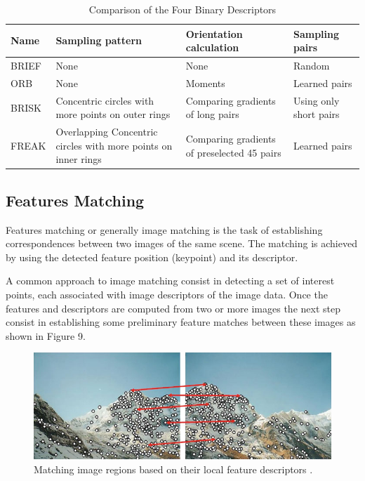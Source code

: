\documentclass[9pt,shortpaper,twoside,web]{ieeecolor}
\begin{document}
\begin{table}[htb]
\caption{Comparison of the Four Binary Descriptors}
\label{table1}
\setlength{\tabcolsep}{3pt}
\begin{tabular}{|p{}|p{}|p{}|p{}|}
\hline

Name&
Sampling pattern&
Orientation calculation&
Sampling pairs\\
\hline

BRIEF&
None&
None&
Random\\
\hline

ORB&
None&
Moments&
Learned pairs\\
\hline

BRISK&
Concentric circles with more points on outer rings&
Comparing gradients of long pairs&
Using only short pairs\\
\hline

FREAK&
Overlapping Concentric circles with more points on inner rings&
Comparing gradients of preselected 45 pairs&
Learned pairs\\
\hline

\end{tabular}
\label{tab1}
\end{table}

\subsection{Features Matching}
Features matching or generally image matching is the task of establishing correspondences between two images of the same scene. The matching is achieved by using the detected feature position (keypoint) and its descriptor.

A common approach to image matching consist in detecting a set of interest points, each associated with image descriptors of the image data. Once the features and descriptors are computed from two or more images the next step consist in establishing some preliminary feature matches between these images as shown in Figure 9.

\begin{figure}[htb]
\includegraphics[width=\columnwidth]{res/fig/Matching.png}
\caption{Matching image regions based on their local feature descriptors \cite{b6}.}
\label{fig9}
\end{figure}
\end{document}
